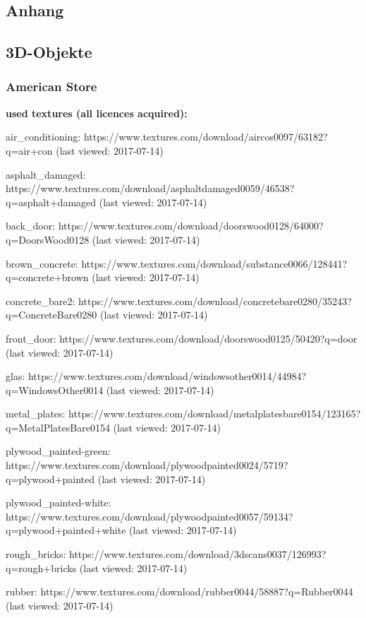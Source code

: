 \documentclass{Paper}
\begin{document}
\begin{appendix}
\section{Anhang}

\subsection{3D-Objekte}

\subsubsection{American Store}

\textbf{used textures (all licences acquired):}


air\_conditioning:
https://www.textures.com/download/aircos0097/63182?q=air+con
(last viewed: 2017-07-14)

asphalt\_damaged:
https://www.textures.com/download/asphaltdamaged0059/46538?q=asphalt+damaged
(last viewed: 2017-07-14)

back\_door:
https://www.textures.com/download/doorswood0128/64000?q=DoorsWood0128
(last viewed: 2017-07-14)

brown\_concrete:
https://www.textures.com/download/substance0066/128441?q=concrete+brown
(last viewed: 2017-07-14)

concrete\_bare2:
https://www.textures.com/download/concretebare0280/35243?q=ConcreteBare0280
(last viewed: 2017-07-14)

front\_door:
https://www.textures.com/download/doorswood0125/50420?q=door
(last viewed: 2017-07-14)

glas:
https://www.textures.com/download/windowsother0014/44984?q=WindowsOther0014
(last viewed: 2017-07-14)

metal\_plates:
https://www.textures.com/download/metalplatesbare0154/123165?q=MetalPlatesBare0154
(last viewed: 2017-07-14)

plywood\_painted-green:
https://www.textures.com/download/plywoodpainted0024/5719?q=plywood+painted
(last viewed: 2017-07-14)

plywood\_painted-white:
https://www.textures.com/download/plywoodpainted0057/59134?q=plywood+painted+white
(last viewed: 2017-07-14)

rough\_bricks:
https://www.textures.com/download/3dscans0037/126993?q=rough+bricks
(last viewed: 2017-07-14)

rubber:
https://www.textures.com/download/rubber0044/58887?q=Rubber0044
(last viewed: 2017-07-14)


\end{appendix}
\end{document}
